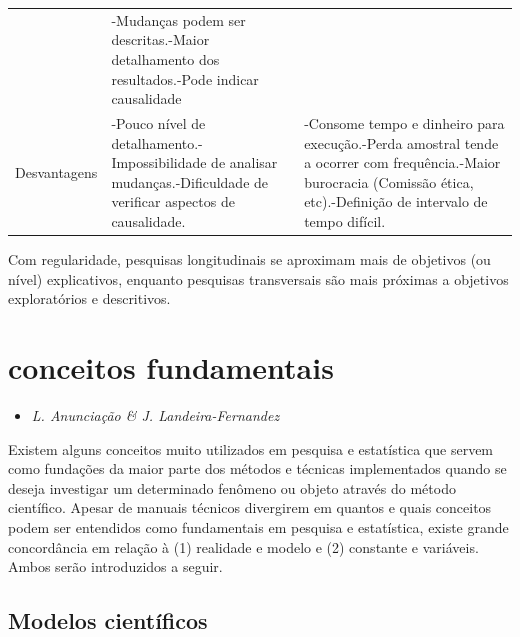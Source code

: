 \documentclass[
]{book}
\providecommand{\tightlist}{%
  \setlength{\itemsep}{0pt}\setlength{\parskip}{0pt}}
\begin{document}
\begin{longtable}[]{@{}lll@{}}
\begin{minipage}[t]{0.29\columnwidth}
\end{minipage} & \begin{minipage}[t]{0.31\columnwidth}\raggedright
-Mudanças podem ser descritas.-Maior detalhamento dos resultados.-Pode indicar causalidade\strut
\end{minipage}\tabularnewline
\begin{minipage}[t]{0.31\columnwidth}\raggedright
Desvantagens\strut
\end{minipage} & \begin{minipage}[t]{0.29\columnwidth}\raggedright
-Pouco nível de detalhamento.-Impossibilidade de analisar mudanças.-Dificuldade de verificar aspectos de causalidade.\strut
\end{minipage} & \begin{minipage}[t]{0.31\columnwidth}\raggedright
-Consome tempo e dinheiro para execução.-Perda amostral tende a ocorrer com frequência.-Maior burocracia (Comissão ética, etc).-Definição de intervalo de tempo difícil.\strut
\end{minipage}\tabularnewline
\bottomrule
\end{longtable}

Com regularidade, pesquisas longitudinais se aproximam mais de objetivos (ou nível) explicativos, enquanto pesquisas transversais são mais próximas a objetivos exploratórios e descritivos.

\hypertarget{conceitos-fundamentais}{%
\section{conceitos fundamentais}\label{conceitos-fundamentais}}

\begin{itemize}
\tightlist
\item
  \emph{L. Anunciação \& J. Landeira-Fernandez}
\end{itemize}

Existem alguns conceitos muito utilizados em pesquisa e estatística que servem como fundações da maior parte dos métodos e técnicas implementados quando se deseja investigar um determinado fenômeno ou objeto através do método científico. Apesar de manuais técnicos divergirem em quantos e quais conceitos podem ser entendidos como fundamentais em pesquisa e estatística, existe grande concordância em relação à (1) realidade e modelo e (2) constante e variáveis. Ambos serão introduzidos a seguir.

\hypertarget{modelos-cientuxedficos}{%
\subsection{Modelos científicos}\label{modelos-cientuxedficos}}
\end{document}
